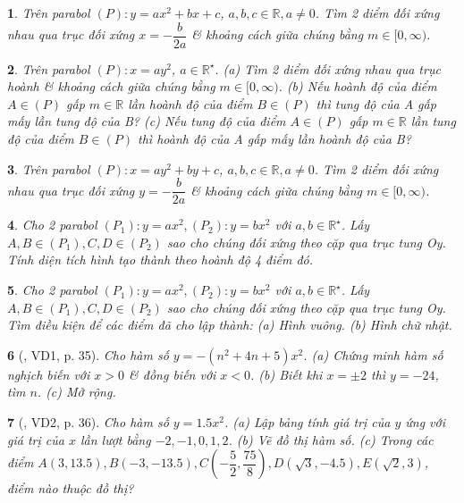\documentclass{article}
\newtheorem{baitoan}{}
\begin{document}
\begin{baitoan}
	Trên parabol $(P):y = ax^2 + bx + c$, $a,b,c\in\mathbb{R},a\ne0$. Tìm 2 diểm đối xứng nhau qua trục đối xứng $x = -\dfrac{b}{2a}$ \& khoảng cách giữa chúng bằng $m\in[0,\infty)$.
\end{baitoan}

\begin{baitoan}
	Trên parabol $(P):x = ay^2$, $a\in\mathbb{R}^\star$. (a) Tìm 2 diểm đối xứng nhau qua trục hoành \& khoảng cách giữa chúng bằng $m\in[0,\infty)$. (b) Nếu hoành độ của điểm $A\in(P)$ gấp $m\in\mathbb{R}$ lần hoành độ của điểm $B\in(P)$ thì tung độ của A gấp mấy lần tung độ của B? (c) Nếu tung độ của điểm $A\in(P)$ gấp $m\in\mathbb{R}$ lần tung độ của điểm $B\in(P)$ thì hoành độ của A gấp mấy lần hoành độ của B?
\end{baitoan}

\begin{baitoan}
	Trên parabol $(P):x = ay^2 + by + c$, $a,b,c\in\mathbb{R},a\ne0$. Tìm 2 diểm đối xứng nhau qua trục đối xứng $y = -\dfrac{b}{2a}$ \& khoảng cách giữa chúng bằng $m\in[0,\infty)$.
\end{baitoan}

\begin{baitoan}
	Cho 2 parabol $(P_1):y = ax^2,(P_2):y = bx^2$ với $a,b\in\mathbb{R}^\star$. Lấy $A,B\in(P_1),C,D\in(P_2)$ sao cho chúng đối xứng theo cặp qua trục tung Oy. Tính diện tích hình tạo thành theo hoành độ 4 điểm đó.
\end{baitoan}

\begin{baitoan}
	Cho 2 parabol $(P_1):y = ax^2,(P_2):y = bx^2$ với $a,b\in\mathbb{R}^\star$. Lấy $A,B\in(P_1),C,D\in(P_2)$ sao cho chúng đối xứng theo cặp qua trục tung Oy. Tìm điều kiện để các điểm đã cho lập thành: (a) Hình vuông. (b) Hình chữ nhật.
\end{baitoan}

\begin{baitoan}[\cite{Binh_boi_duong_Toan_9_tap_2}, VD1, p. 35]
	Cho hàm số $y = -(n^2 + 4n + 5)x^2$. (a) Chứng minh hàm số nghịch biến với $x > 0$ \& đồng biến với $x < 0$. (b) Biết khi $x = \pm2$ thì $y = -24$, tìm $n$. (c) Mở rộng.
\end{baitoan}

\begin{baitoan}[\cite{Binh_boi_duong_Toan_9_tap_2}, VD2, p. 36]
	Cho hàm số $y = 1.5x^2$. (a) Lập bảng tính giá trị của $y$ ứng với giá trị của $x$ lần lượt bằng $-2,-1,0,1,2$. (b) Vẽ đồ thị hàm số. (c) Trong các điểm $A(3,13.5),B(-3,-13.5),C\left(-\dfrac{5}{2},\dfrac{75}{8}\right),D(\sqrt{3},-4.5),E(\sqrt{2},3)$, điểm nào thuộc đồ thị?
\end{baitoan}
\end{document}
